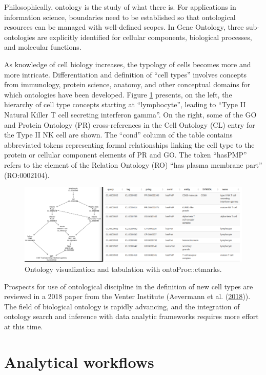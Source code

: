 \documentclass[]{article}
\begin{document}
Philosophically, ontology is the study of what there is. For
applications in information
science,
boundaries need to be established so that ontological
resources can be managed with well-defined scopes. In Gene
Ontology, three sub-ontologies are explicitly identified for
cellular components, biological processes, and molecular functions.

As knowledge of cell biology increases, the typology of
cells becomes more and more intricate. Differentiation
and definition
of ``cell types'' involves concepts from immunology,
protein science, anatomy, and other conceptual domains
for which ontologies have been developed. Figure \ref{fig:ontopair}
presents, on the left, the hierarchy of cell type concepts starting at ``lymphocyte'',
leading to ``Type II Natural Killer T cell secreting interferon gamma''.
On the right, some of the GO and Protein Ontology (PR) cross-references
in the Cell Ontology (CL) entry for the Type II NK cell are shown.
The ``cond'' column of the table contains abbreviated tokens
representing formal relationships linking the cell type
to the protein or cellular component elements of PR and GO.
The token ``hasPMP'' refers to the element of the Relation Ontology
(RO) ``has plasma membrane part'' (RO:0002104).

\begin{figure}
\includegraphics[width=1\linewidth,]{ontoPair} \caption{Ontology visualization and tabulation with ontoProc::ctmarks.}\label{fig:ontopair}
\end{figure}

Prospects for use of ontological discipline in the
definition of new cell types are reviewed in a 2018
paper from the Venter Institute (Aevermann et al. (\protect\hyperlink{ref-Aevermann2018}{2018})).
The field of biological ontology is rapidly advancing,
and the integration of ontology search and inference
with data analytic frameworks requires more effort at this time.

\hypertarget{analytical-workflows}{%
\section{Analytical workflows}\label{analytical-workflows}}
\end{document}
